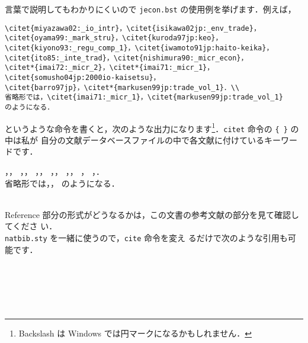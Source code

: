 \documentclass[article]{jlreq}
\begin{document}
言葉で説明してもわかりにくいので \texttt{jecon.bst} の使用例を挙げます．例えば，
\begin{screen}
\begin{verbatim}
\citet{miyazawa02:_io_intr}，\citet{isikawa02jp:_env_trade}，
\citet{oyama99:_mark_stru}，\citet{kuroda97jp:keo}，
\citet{kiyono93:_regu_comp_1}，\citet{iwamoto91jp:haito-keika}，
\citet{ito85:_inte_trad}，\citet{nishimura90:_micr_econ}，
\citet*{imai72:_micr_2}，\citet*{imai71:_micr_1}，
\citet{somusho04jp:2000io-kaisetsu}，
\citet{barro97jp}，\citet*{markusen99jp:trade_vol_1}．\\
省略形では，\citet{imai71:_micr_1}，\citet{markusen99jp:trade_vol_1}
のようになる．
\end{verbatim}
\end{screen}
というような命令を書くと，次のような出力になります\footnote{Backslash は Windows
では円マークになるかもしれません．}．\texttt{citet} 命令の \verb|{ }| の中は私が
自分の文献データベースファイルの中で各文献に付けているキーワードです．

\begin{screen}
\citet{miyazawa02:_io_intr}，\citet{isikawa02jp:_env_trade}，
\citet{oyama99:_mark_stru}，\citet{kuroda97jp:keo}，
\citet{kiyono93:_regu_comp_1}，\citet{iwamoto91jp:haito-keika}，
\citet{ito85:_inte_trad}，\citet{nishimura90:_micr_econ}，
\citet*{imai72:_micr_2}，\citet*{imai71:_micr_1}，
\citet{somusho04jp:2000io-kaisetsu}，
\citet{barro97jp}，\citet*{markusen99jp:trade_vol_1}．\\
省略形では，\citet{imai71:_micr_1}，\citet{markusen99jp:trade_vol_1}
のようになる．
\end{screen}
\\

Reference 部分の形式がどうなるかは，この文書の参考文献の部分を見て確認してくださ
い．
\\

\texttt{natbib.sty} を一緒に使うので，\texttt{cite} 命令を変え
るだけで次のような引用も可能です．
\begin{screen}
\hspace*{1cm} \citet{ito85:_inte_trad}\\
\hspace*{1cm} \citep{ito85:_inte_trad}\\
\hspace*{1cm} \citet[p.100]{ito85:_inte_trad}\\
\hspace*{1cm} \citet[p.200 参照]{ito85:_inte_trad}\\
\hspace*{1cm} \citep[詳しくは][]{ito85:_inte_trad}
\end{screen}
\end{document}
